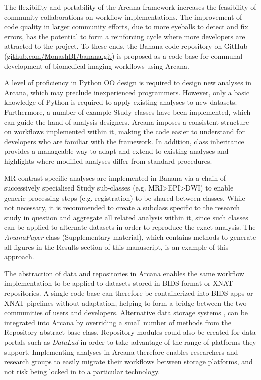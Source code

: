 \documentclass[smallextended]{svjour3}       %
\begin{document}
The flexibility and portability of the Arcana framework increases the
feasibility of community collaborations on workflow implementations. The
improvement of code quality in larger community efforts, due to more
eyeballs to detect and fix errors, has the potential to form a
reinforcing cycle where more developers are attracted to the project.
To these ends, the Banana code repository on GitHub
(\url{github.com/MonashBI/banana.git}) is proposed as a code base
for communal development of biomedical imaging workflows using Arcana.

A level of proficiency in Python OO design is required to design new
analyses in Arcana, which may preclude inexperienced programmers.
However, only a basic knowledge of Python is required to apply existing
analyses to new datasets. Furthermore, a number of example Study classes
have been implemented, which can guide the hand of analysis designers.
Arcana imposes a consistent structure on workflows implemented within
it, making the code easier to understand for developers who are familiar
with the framework. In addition, class inheritance provides a manageable
way to adapt and extend to existing analyses and highlights where
modified analyses differ from standard procedures.

MR contrast-specific analyses are implemented in Banana via a chain
of successively specialised Study sub-classes (e.g.
MRI\textgreater{}EPI\textgreater{}DWI) to enable generic processing
steps (e.g. registration) to be shared between classes. While not
necessary, it is recommended to create a subclass specific to the
research study in question and aggregate all related analysis within it,
since such classes can be applied to alternate datasets in order to
reproduce the exact analysis. The \emph{ArcanaPaper} class
(Supplementary material), which contains methods to generate all figures
in the Results section of this manuscript, is an example of this approach.

The abstraction of data and repositories in Arcana enables the same
workflow implementation to be applied to datasets stored in BIDS format
or XNAT repositories. A single code-base can therefore be containerized
into BIDS apps or XNAT pipelines without adaptation, helping to form a
bridge between the two communities of users and developers. Alternative
data storage systems \citep{scott_coins:_2011,das_loris:_2012,book_neuroinformatics_2013},
can be integrated into Arcana by overriding a small number of
methods from the Repository abstract base class. Repository modules
could also be created for data portals such as \emph{DataLad}
\citep{yaroslav_halchenko_datalad/datalad_2018}
in order to take advantage of the range of platforms they support.
Implementing analyses in Arcana therefore enables researchers and
research groups to easily migrate their workflows between storage
platforms, and not risk being locked in to a particular technology.
\end{document}
